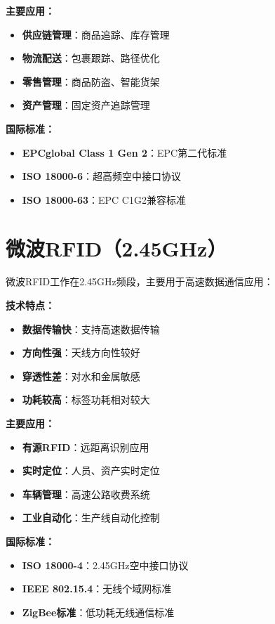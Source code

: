 \documentclass[12pt,UTF8]{ctexbook}
\begin{document}
\begin{itemize}[leftmargin=3.5em]
\textbf{主要应用：}
\begin{itemize}[leftmargin=3.5em]
    \item \textbf{供应链管理}：商品追踪、库存管理
    \item \textbf{物流配送}：包裹跟踪、路径优化
    \item \textbf{零售管理}：商品防盗、智能货架
    \item \textbf{资产管理}：固定资产追踪管理
\end{itemize}

\textbf{国际标准：}
\begin{itemize}[leftmargin=3.5em]
    \item \textbf{EPCglobal Class 1 Gen 2}：EPC第二代标准
    \item \textbf{ISO 18000-6}：超高频空中接口协议
    \item \textbf{ISO 18000-63}：EPC C1G2兼容标准
\end{itemize}

\section{微波RFID（2.45GHz）}

微波RFID工作在2.45GHz频段，主要用于高速数据通信应用：

\textbf{技术特点：}
\begin{itemize}[leftmargin=3.5em]
    \item \textbf{数据传输快}：支持高速数据传输
    \item \textbf{方向性强}：天线方向性较好
    \item \textbf{穿透性差}：对水和金属敏感
    \item \textbf{功耗较高}：标签功耗相对较大
\end{itemize}

\textbf{主要应用：}
\begin{itemize}[leftmargin=3.5em]
    \item \textbf{有源RFID}：远距离识别应用
    \item \textbf{实时定位}：人员、资产实时定位
    \item \textbf{车辆管理}：高速公路收费系统
    \item \textbf{工业自动化}：生产线自动化控制
\end{itemize}

\textbf{国际标准：}
\begin{itemize}[leftmargin=3.5em]
    \item \textbf{ISO 18000-4}：2.45GHz空中接口协议
    \item \textbf{IEEE 802.15.4}：无线个域网标准
    \item \textbf{ZigBee标准}：低功耗无线通信标准
\end{itemize}


\end{itemize}
\end{document}
